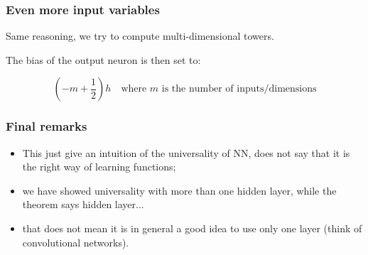 \documentclass[usenames,dvipsnames]{beamer}
\begin{document}

\begin{frame}
  \frametitle{Even more input variables}
  
  Same reasoning, we try to compute multi-dimensional towers.
  
  The bias of the output neuron is then set to:
  
  \[ ( -m + \frac{1}{2} )h \quad \text{where $m$ is the number of inputs/dimensions} \]
  
\end{frame}


\begin{frame}
  \frametitle{Final remarks}
  
  \begin{itemize}
  \item This just give an intuition of the universality of NN, does not say that it is the right way of learning functions;
  \item we have showed universality with more than one hidden layer, while the theorem says  hidden layer...
\item that does not mean it is in general a good idea to use only one layer (think of convolutional networks).
\end{itemize}
  
\end{frame}



\end{document}
